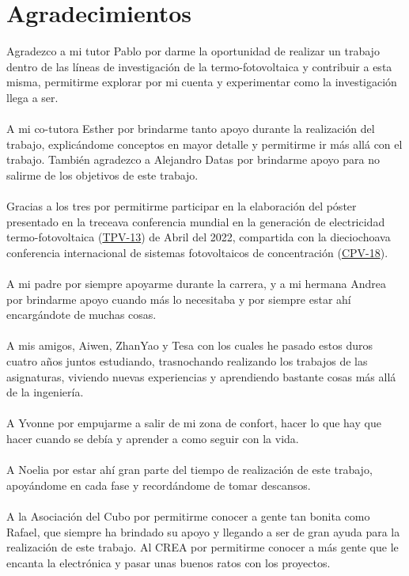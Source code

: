 \chapter{Agradecimientos}

Agradezco a mi tutor Pablo por darme la oportunidad de realizar un trabajo dentro de las líneas de investigación de la termo-fotovoltaica y contribuir a esta misma, permitirme explorar por mi cuenta y experimentar como la investigación llega a ser.\\\\
A mi co-tutora Esther por brindarme tanto apoyo durante la realización del trabajo, explicándome conceptos en mayor detalle y permitirme ir más allá con el trabajo. También agradezco a Alejandro Datas por brindarme apoyo para no salirme de los objetivos de este trabajo.\\\\
Gracias a los tres por permitirme participar en la elaboración del póster presentado en la treceava conferencia mundial en la generación de electricidad termo-fotovoltaica (\href{https://www.tpv-13.org/}{TPV-13}) de Abril del 2022, compartida con la dieciochoava conferencia internacional de sistemas fotovoltaicos de concentración (\href{https://www.cpv-18.org/}{CPV-18}).\\\\  
A mi padre por siempre apoyarme durante la carrera, y a mi hermana Andrea por brindarme apoyo cuando más lo necesitaba y por siempre estar ahí encargándote de muchas cosas.\\\\
A mis amigos, Aiwen, ZhanYao y Tesa con los cuales he pasado estos duros cuatro años juntos estudiando, trasnochando realizando los trabajos de las asignaturas, viviendo nuevas experiencias y aprendiendo bastante cosas más allá de la ingeniería.\\\\
A Yvonne por empujarme a salir de mi zona de confort, hacer lo que hay que hacer cuando se debía y aprender a como seguir con la vida.\\\\
A Noelia por estar ahí gran parte del tiempo de realización de este trabajo, apoyándome en cada fase y recordándome de tomar descansos.\\\\
A la Asociación del Cubo por permitirme conocer a gente tan bonita como Rafael, que siempre ha brindado su apoyo y llegando a ser de gran ayuda para la realización de este trabajo. Al CREA por permitirme conocer a más gente que le encanta la electrónica y pasar unas buenos ratos con los proyectos.\\\\
